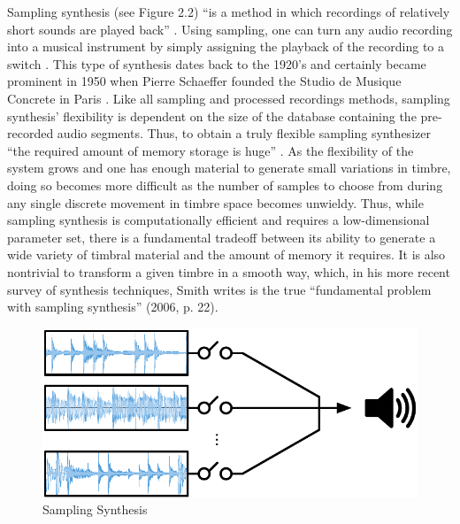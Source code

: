 \documentclass[a4paper,12pt]{report} 	%
\numberwithin{figure}{chapter}
\numberwithin{table}{chapter}
\numberwithin{equation}{chapter}
\begin{document}
\begin{flushleft}
Sampling synthesis (see Figure 2.2) ``is a method in which recordings of relatively short sounds are played back'' \cite[p. 10]{Tolonen:1998bh}. Using sampling, one can turn any audio recording into a musical instrument by simply assigning the playback of the recording to a switch \cite[p. 1]{Heise:2009sp}. This type of synthesis dates back to the 1920's and certainly became prominent in 1950 when Pierre Schaeffer founded the Studio de Musique Concrete in Paris \cite[p. 3]{Tolonen:1998bh}. Like all sampling and processed recordings methods, sampling synthesis' flexibility is dependent on the size of the database containing the pre-recorded audio segments. Thus, to obtain a truly flexible sampling synthesizer ``the required amount of memory storage is huge'' \cite[p. 11]{Tolonen:1998bh}. As the flexibility of the system grows and one has enough material to generate small variations in timbre, doing so becomes more difficult as the number of samples to choose from during any single discrete movement in timbre space becomes unwieldy. Thus, while sampling synthesis is computationally efficient and requires a low-dimensional parameter set, there is a fundamental tradeoff between its ability to generate a wide variety of timbral material and the amount of memory it requires. It is also nontrivial to transform a given timbre in a smooth way, which, in his more recent survey of synthesis techniques, Smith writes is the true ``fundamental problem with sampling synthesis'' (2006, p. 22).
\\
\begin{figure}[h!]
\begin{center}
\includegraphics[scale=0.8]{SamplingSynthesis}
\caption[Sampling Synthesis]{Sampling Synthesis}
\end{center}
\end{figure}

\end{flushleft}
\end{document}
